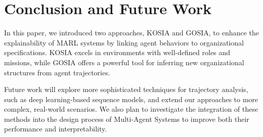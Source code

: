 \documentclass[sn-mathphys-num]{sn-jnl}%
\theoremstyle{thmstyleone}%
\theoremstyle{thmstyletwo}%
\theoremstyle{thmstylethree}%
\begin{document}
\section{Conclusion and Future Work}
\label{sec:conclusion}

In this paper, we introduced two approaches, KOSIA and GOSIA, to enhance the explainability of MARL systems by linking agent behaviors to organizational specifications. KOSIA excels in environments with well-defined roles and missions, while GOSIA offers a powerful tool for inferring new organizational structures from agent trajectories.

Future work will explore more sophisticated techniques for trajectory analysis, such as deep learning-based sequence models, and extend our approaches to more complex, real-world scenarios. We also plan to investigate the integration of these methods into the design process of Multi-Agent Systems to improve both their performance and interpretability.





\end{document}
